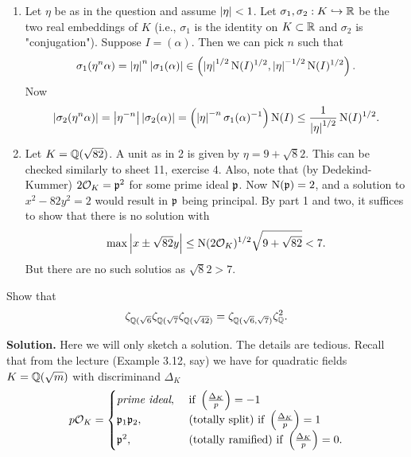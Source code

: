 \documentclass[a4paper,11pt]{article}
\begin{document}
\begin{enumerate}[wide, labelindent=0pt]
    \item Let $\eta$ be as in the question and assume $\left\lvert \eta \right\rvert < 1$. Let
        $\sigma_1, \sigma_2: K \hookrightarrow \mathbb{R}$ be the two real embeddings of $K$ (i.e., 
        $\sigma_1$ is the identity on $K \subset \mathbb{R}$ and $\sigma_2$ is "conjugation").
        Suppose $I = (\alpha)$. Then we can pick $n$ such that 
        \begin{equation*}
            \sigma_1(\eta^n \alpha) = \left\lvert \eta \right\rvert^n \left\lvert \sigma_1(\alpha) \right\rvert
            \in \left(\left\lvert \eta \right\rvert^{1/2} \operatorname{N}(I)^{1/2}, \left\lvert \eta \right\rvert^{-1/2}
            \operatorname{N}(I)^{1/2}\right).
        \end{equation*}
        Now 
        \begin{equation*}
            \left\lvert \sigma_2(\eta^n \alpha) \right\rvert = \left\lvert \eta^{-n} \right\rvert \left\lvert \sigma_2(\alpha) \right\rvert
            = \left( \left\lvert \eta \right\rvert^{-n} \sigma_1(\alpha)^{-1} \right) \operatorname{N}(I)
                \leq \frac 1{\left\lvert \eta \right\rvert^{1/2}} \operatorname{N}(I)^{1/2}.
        \end{equation*}

    \item Let $K = \mathbb{Q}(\sqrt {82})$. A unit as in 2 is given by $\eta = 9 + \sqrt 82$. 
        This can be checked similarly to sheet 11, exercise 4. 
        Also, note that (by Dedekind-Kummer) $2 \mathcal{O}_K= \mathfrak{p}^2$ for some prime
        ideal $\mathfrak{p}$. Now $\operatorname{N}(\mathfrak{p})=2$, and a solution to $x^2 - 82y^2 = 2$
        would result in $\mathfrak{p}$ being principal. 
        By part 1 and two, it suffices to show that there is no solution with
        $$\max \left\lvert x \pm \sqrt {82} y \right\rvert \leq \operatorname{N}(2 \mathcal{O}_K)^{1/2} \sqrt{9 + \sqrt{82}}
        < 7.$$
        But there are no such solutios as $\sqrt 82 > 7$. 
\end{enumerate}


Show that 
\begin{equation*}
    \zeta_{\mathbb{Q}(\sqrt 6} \zeta_{\mathbb{Q}(\sqrt 7} \zeta_{\mathbb{Q}(\sqrt {42})} 
    = \zeta_{\mathbb{Q}(\sqrt 6, \sqrt 7)} \zeta_{\mathbb{Q}}^2.
\end{equation*}

\textbf{Solution.} 
Here we will only sketch a solution. The details are tedious.
Recall that from the lecture (Example 3.12, say) we have for quadratic fields
$K = \mathbb{Q}(\sqrt m)$ with discriminand $\Delta_K$
\begin{equation*}
    p\mathcal{O}_K = 
    \begin{cases}
        \textit{prime ideal}, &\text{ if } \left( \frac{\Delta_K}{p} \right) = -1 \\
        \mathfrak{p}_1 \mathfrak{p}_2, &\text{ (totally split) if } \left( \frac{\Delta_K}{p} \right) = 1 \\
        \mathfrak{p}^2, &\text{ (totally ramified) if } \left( \frac{\Delta_K}{p} \right) = 0.
    \end{cases}
\end{equation*}
\end{document}
